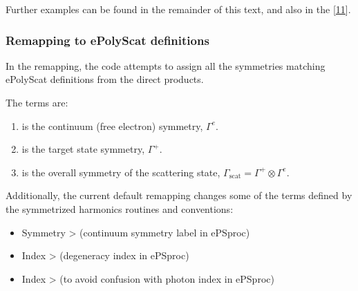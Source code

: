 \documentclass[letterpaper,table,10pt,english]{jupyterBook}
\begin{document}
\sphinxAtStartPar
Further examples can be found in the remainder of this text, and also in the  {[}\hyperlink{cite.backmatter/bibliography:id617}{11}{]}.


\subsubsection{Remapping to ePolyScat definitions}
\label{\detokenize{part2/sym-fitting-intro_220423:remapping-to-epolyscat-definitions}}\label{\detokenize{part2/sym-fitting-intro_220423:sec-basis-sets-remapping-to-eps}}
\sphinxAtStartPar
In the remapping, the code attempts to assign all the symmetries matching ePolyScat definitions from the direct products.

\sphinxAtStartPar
The terms are:
\begin{enumerate}
%
\item {} 
\sphinxAtStartPar
{} is the continuum (free electron) symmetry, \(\Gamma^{e}\).

\item {} 
\sphinxAtStartPar
{} is the target state symmetry, \(\Gamma^{+}\).

\item {} 
\sphinxAtStartPar
{} is the overall symmetry of the scattering state, \(\Gamma_{\mathrm{scat}}=\Gamma^{+}\otimes\Gamma^{e}\).

\end{enumerate}

\sphinxAtStartPar
Additionally, the current default remapping changes some of the terms defined by the symmetrized harmonics routines and conventions:
\begin{itemize}
\item {} 
\sphinxAtStartPar
Symmetry  >  (continuum symmetry label in ePSproc)

\item {} 
\sphinxAtStartPar
Index  >  (degeneracy index in ePSproc)

\item {} 
\sphinxAtStartPar
Index  >  (to avoid confusion with photon index  in ePSproc)

\end{itemize}
\end{document}
